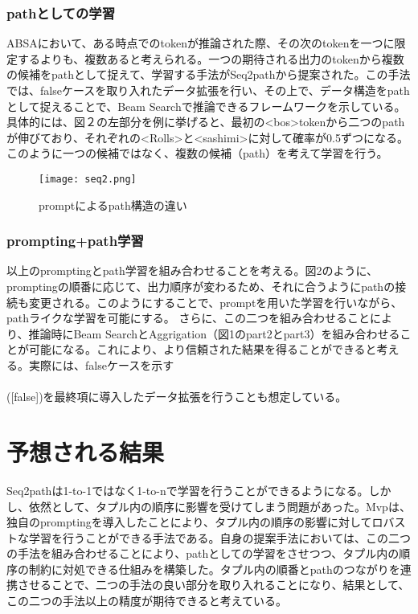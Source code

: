 \documentclass[a4j,10pt, twocolumn]{jarticle} \usepackage[dvipdfmx]{graphicx} \usepackage{amssymb} \usepackage{amsmath}
\begin{document}
\subsubsection{pathとしての学習}
ABSAにおいて、ある時点でのtokenが推論された際、その次のtokenを一つに限定するよりも、複数あると考えられる。一つの期待される出力のtokenから複数の候補をpathとして捉えて、学習する手法がSeq2pathから提案された。この手法では、falseケースを取り入れたデータ拡張を行い、その上で、データ構造をpathとして捉えることで、Beam Searchで推論できるフレームワークを示している。
具体的には、図２の左部分を例に挙げると、最初の\textless bos\textgreater tokenから二つのpathが伸びており、それぞれの\textless Rolls\textgreater と\textless sashimi\textgreater に対して確率が0.5ずつになる。このように一つの候補ではなく、複数の候補（path）を考えて学習を行う。
\begin{figure}[h]
  \centering
  \texttt{[image: seq2.png]}
  \caption{promptによるpath構造の違い}
  \label{fig:enter-label}
\end{figure}
\subsubsection{prompting+path学習}
以上のpromptingとpath学習を組み合わせることを考える。図2のように、promptingの順番に応じて、出力順序が変わるため、それに合うようにpathの接続も変更される。このようにすることで、promptを用いた学習を行いながら、pathライクな学習を可能にする。
さらに、この二つを組み合わせることにより、推論時にBeam SearchとAggrigation（図1のpart2とpart3）を組み合わせることが可能になる。これにより、より信頼された結果を得ることができると考える。実際には、falseケースを示す\\
\\([false])を最終項に導入したデータ拡張を行うことも想定している。

\section{予想される結果}
Seq2pathは1-to-1ではなく1-to-nで学習を行うことができるようになる。しかし、依然として、タプル内の順序に影響を受けてしまう問題があった。Mvpは、独自のpromptingを導入したことにより、タプル内の順序の影響に対してロバストな学習を行うことができる手法である。自身の提案手法においては、この二つの手法を組み合わせることにより、pathとしての学習をさせつつ、タプル内の順序の制約に対処できる仕組みを構築した。タプル内の順番とpathのつながりを連携させることで、二つの手法の良い部分を取り入れることになり、結果として、この二つの手法以上の精度が期待できると考えている。
\end{document}
